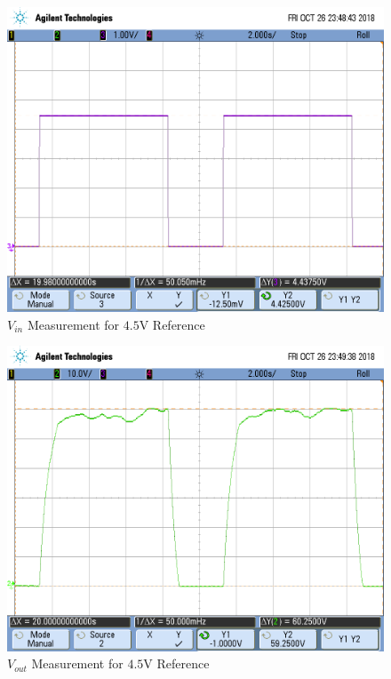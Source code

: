 \FloatBarrier


\FloatBarrier

\begin{figure}[h!]
	\centering
	\includegraphics[scale=0.75]{../images/scope_14.PNG}
	\caption{$V_{in}$ Measurement for $4.5$\si{\volt} Reference}
	\label{fig:scope_14}
\end{figure}

\FloatBarrier

\FloatBarrier

\begin{figure}[h!]
	\centering
	\includegraphics[scale=0.75]{../images/scope_15.PNG}
	\caption{$V_{out}$ Measurement for $4.5$\si{\volt} Reference}
	\label{fig:scope_15}
\end{figure}


